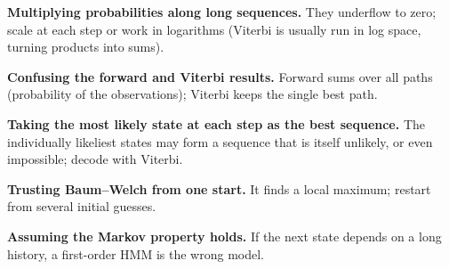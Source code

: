 \begin{pitfall}
\begin{tight}
  \item \textbf{Multiplying probabilities along long sequences.} They underflow to
        zero; scale at each step or work in logarithms (Viterbi is usually run in log
        space, turning products into sums).
  \item \textbf{Confusing the forward and Viterbi results.} Forward sums over all
        paths (probability of the observations); Viterbi keeps the single best path.
  \item \textbf{Taking the most likely state at each step as the best sequence.}
        The individually likeliest states may form a sequence that is itself
        unlikely, or even impossible; decode with Viterbi.
  \item \textbf{Trusting Baum--Welch from one start.} It finds a local maximum;
        restart from several initial guesses.
  \item \textbf{Assuming the Markov property holds.} If the next state depends on a
        long history, a first-order HMM is the wrong model.
\end{tight}
\end{pitfall}

